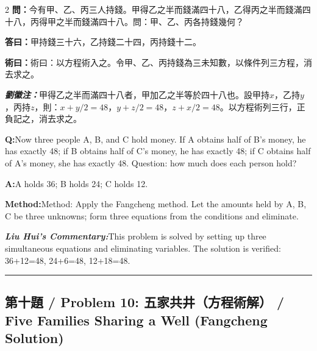\documentclass[11pt,a4paper]{article}
\newcommand{\cnwen}{\textcolor{cnlabelfg}{\textbf{問：}}}
\newcommand{\cnda}{\textbf{答曰：}}
\newcommand{\cnshu}{\textcolor{cnlabelfg}{\textbf{術曰：}}}
\newcommand{\cnzhu}{\textcolor{commentarycolor}{\textit{\textbf{劉徽注：}}}}
\newcommand{\enwen}{\textcolor{enlabelfg}{\textbf{Q:}}}
\newcommand{\enda}{\textcolor{enlabelfg}{\textbf{A:}}}
\newcommand{\enshu}{\textcolor{enlabelfg}{\textbf{Method:}}}
\newcommand{\enzhu}{\textcolor{enlabelfg}{\textit{\textbf{Liu Hui's Commentary:}}}}
\begin{document}
\begin{paracol}{2}
\switchcolumn[0]
\cnwen 今有甲、乙、丙三人持錢。甲得乙之半而錢滿四十八，乙得丙之半而錢滿四十八，丙得甲之半而錢滿四十八。問：甲、乙、丙各持錢幾何？

\cnda 甲持錢三十六，乙持錢二十四，丙持錢十二。

\cnshu 術曰：以方程術入之。令甲、乙、丙持錢為三未知數，以條件列三方程，消去求之。

\cnzhu 甲得乙之半而滿四十八者，甲加乙之半等於四十八也。設甲持$x$，乙持$y$，丙持$z$，則：$x + y/2 = 48$，$y + z/2 = 48$，$z + x/2 = 48$。以方程術列三行，正負記之，消去求之。

\switchcolumn[1]
\enwen Now three people A, B, and C hold money. If A obtains half of B's money, he has exactly 48; if B obtains half of C's money, he has exactly 48; if C obtains half of A's money, she has exactly 48. Question: how much does each person hold?

\enda A holds 36; B holds 24; C holds 12.

\enshu Method: Apply the Fangcheng method. Let the amounts held by A, B, C be three unknowns; form three equations from the conditions and eliminate.

\enzhu This problem is solved by setting up three simultaneous equations and eliminating variables. The solution is verified: 36+12=48, 24+6=48, 12+18=48.
\end{paracol}

\bigskip\hrule\bigskip

\subsection{第十題 / Problem 10: 五家共井（方程術解） / Five Families Sharing a Well (Fangcheng Solution)}
\end{document}

